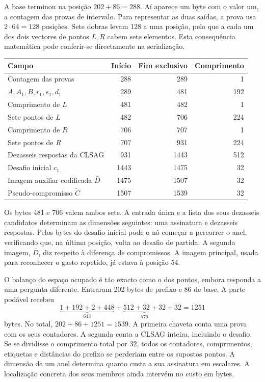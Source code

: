 A base terminou na posição \(202+86=288\). Aí aparece um byte com o
valor um, a contagem das provas de intervalo. Para representar as
duas saídas, a prova usa \(2\cdot64=128\) posições. Sete dobras
levam 128 a uma posição, pelo que a cada um dos dois vectores de
pontos \(L,R\) cabem sete elementos. Esta consequência matemática
pode conferir-se directamente na serialização.
\begin{center}\small
\begin{tabular}{l r r r}
\toprule
Campo & Início & Fim exclusivo & Comprimento\\
\midrule
Contagem das provas & 288 & 289 & 1\\
\(A,A_1,B,r_1,s_1,d_1\) & 289 & 481 & 192\\
Comprimento de \(L\) & 481 & 482 & 1\\
Sete pontos de \(L\) & 482 & 706 & 224\\
Comprimento de \(R\) & 706 & 707 & 1\\
Sete pontos de \(R\) & 707 & 931 & 224\\
\addlinespace
Dezasseis respostas da CLSAG & 931 & 1443 & 512\\
Desafio inicial \(c_1\) & 1443 & 1475 & 32\\
Imagem auxiliar codificada \(\bar D\) & 1475 & 1507 & 32\\
\addlinespace
Pseudo-compromisso \(\widetilde C\) & 1507 & 1539 & 32\\
\bottomrule
\end{tabular}
\end{center}
Os bytes 481 e 706 valem ambos sete. A entrada única e a lista dos
seus dezasseis candidatos determinam as dimensões seguintes: uma
assinatura e dezasseis respostas. Pelos bytes do desafio inicial pode
o nó começar a percorrer o anel, verificando que, na última posição,
volta ao desafio de partida. A segunda imagem, \(\bar D\), diz respeito
à diferença de compromissos. A imagem principal, usada para reconhecer
o gasto repetido, já estava à posição 54.

O balanço do espaço ocupado é tão exacto como o dos pontos, embora
responda a uma pergunta diferente. Entraram 202 bytes de prefixo e
86 de base. A parte podável recebeu
\[
 \underbrace{1+192+2+448}_{643}
 +\underbrace{512+32+32}_{576}+32=1251
\]
bytes. No total, \(202+86+1251=1539\). A primeira chaveta conta
uma prova com os seus contadores. A segunda conta a CLSAG inteira,
incluindo o desafio. Se se dividisse o comprimento total por 32,
todos os contadores, comprimentos, etiquetas e distâncias do prefixo
se perderiam entre os supostos pontos. A dimensão de um anel
determina quanto custa a sua assinatura em escalares. A localização
concreta dos seus membros ainda intervém no custo em bytes.

